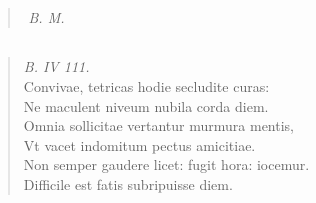 \documentclass[11pt, a4paper]{report}
\begin{document}
            \subsection*{}
      \begin{verse}
      \end{verse}
  
            \subsection*{}
      \begin{verse}
        ﻿\pagebreak 
     \marginpar{[419]} \textit{B. M.} \\ 
      \end{verse}
  
            \subsection*{}
      \begin{verse}
      \textit{B. IV 111.} \\ Convivae, tetricas hodie secludite curas: \\ Ne maculent niveum nubila corda diem. \\ Omnia sollicitae vertantur murmura mentis, \\ Vt vacet indomitum pectus amicitiae. \\ Non semper gaudere licet: fugit hora: iocemur. \\ Difficile est fatis subripuisse diem. \\ 
      \end{verse}
  
\end{document}
